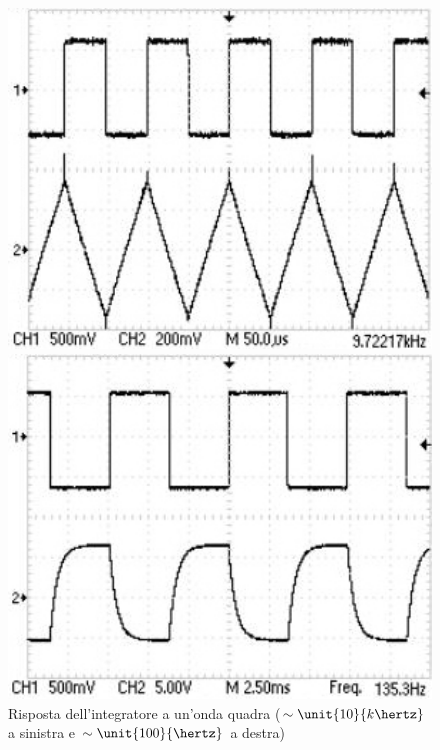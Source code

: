 \documentclass[10pt,a4paper]{article}
\begin{document}
\begin{figure}[H]
	\begin{minipage}[c]{0.49\textwidth}
		\centering
		\includegraphics[width=1\textwidth]{../oscilloscopio/sqint.jpg}
	\end{minipage}
	\begin{minipage}[c]{0.49\textwidth}
		\centering
		\includegraphics[width=1\textwidth]{../oscilloscopio/sqexp.jpg}
	\end{minipage}
	\caption{Risposta dell'integratore a un'onda quadra ($\sim\unit{10}{k\hertz}$ a sinistra e $\sim \unit{100}{\hertz}$ a destra)}
	\label{fig:intsq}
\end{figure}
\end{document}
